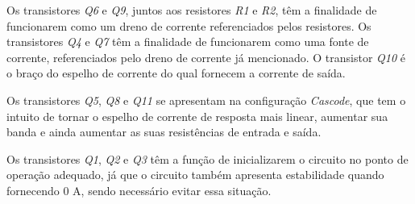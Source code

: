 Os transistores \emph{Q6} e \emph{Q9}, juntos aos resistores \emph{R1} e \emph{R2}, t\^em a finalidade de funcionarem como um dreno de corrente referenciados pelos resistores. Os transistores \emph{Q4} e \emph{Q7} t\^em a finalidade de funcionarem como uma fonte de corrente, referenciados pelo dreno de corrente j\'a mencionado. O transistor \emph{Q10} \'e o bra{\c c}o do espelho de corrente do qual fornecem a corrente de sa\'ida.

Os transistores \emph{Q5}, \emph{Q8} e \emph{Q11} se apresentam na configura{\c c}\~ao \emph{Cascode}, que tem o intuito de tornar o espelho de corrente de resposta mais linear, aumentar sua banda e ainda aumentar as suas resist\^encias de entrada e sa\'ida.

Os transistores \emph{Q1}, \emph{Q2} e \emph{Q3} t\^em a fun{\c c}\~ao de inicializarem o circuito no ponto de opera{\c c}\~ao adequado, j\'a que o circuito tamb\'em apresenta estabilidade quando fornecendo 0 A, sendo necess\'ario evitar essa situa{\c c}\~ao.
